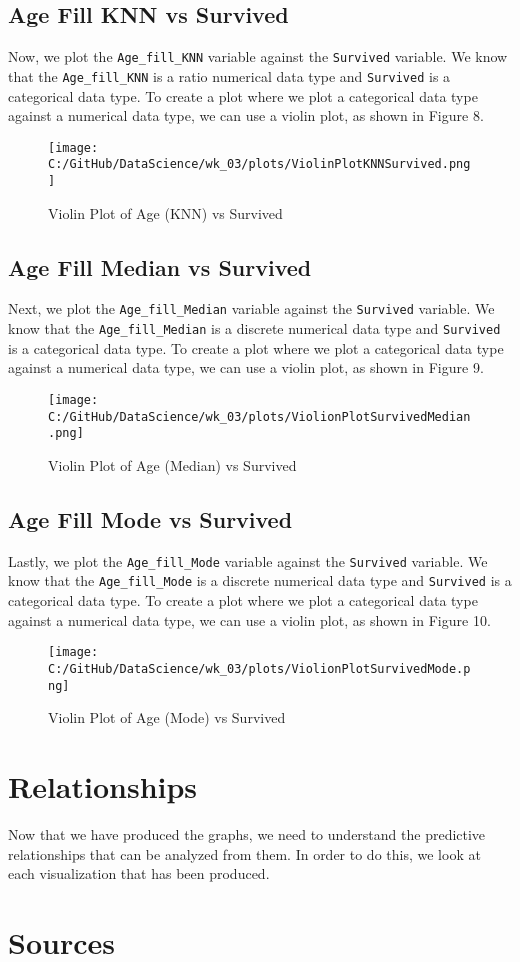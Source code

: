 \documentclass[a4paper, twocolumn]{article}
\begin{document}
\subsection{Age Fill KNN vs Survived}
Now, we plot the \texttt{Age\_fill\_KNN} variable against the \texttt{Survived} variable. We know that the 
\texttt{Age\_fill\_KNN} is a ratio numerical data type and \texttt{Survived} is a categorical data type.
To create a plot where we plot a categorical data type against a numerical data type, we can use a violin plot, as
shown in Figure 8.
\begin{figure}[h!] 
    \centering
    \noindent
    \texttt{[image: C:/GitHub/DataScience/wk\_03/plots/ViolinPlotKNNSurvived.png]}  
    \caption{Violin Plot of Age (KNN) vs Survived} 
\end{figure}

\subsection{Age Fill Median vs Survived}
Next, we plot the \texttt{Age\_fill\_Median} variable against the \texttt{Survived} variable. We know that the 
\texttt{Age\_fill\_Median} is a discrete numerical data type and \texttt{Survived} is a categorical data type.
To create a plot where we plot a categorical data type against a numerical data type, we can use a violin plot, as
shown in Figure 9.
\begin{figure}[h!] 
    \centering
    \noindent
    \texttt{[image: C:/GitHub/DataScience/wk\_03/plots/ViolionPlotSurvivedMedian.png]}  
    \caption{Violin Plot of Age (Median) vs Survived} 
\end{figure}

\subsection{Age Fill Mode vs Survived}
Lastly, we plot the \texttt{Age\_fill\_Mode} variable against the \texttt{Survived} variable. We know that the 
\texttt{Age\_fill\_Mode} is a discrete numerical data type and \texttt{Survived} is a categorical data type.
To create a plot where we plot a categorical data type against a numerical data type, we can use a violin plot, as
shown in Figure 10.
\begin{figure}[h!] 
    \centering
    \noindent
    \texttt{[image: C:/GitHub/DataScience/wk\_03/plots/ViolionPlotSurvivedMode.png]}  
    \caption{Violin Plot of Age (Mode) vs Survived} 
\end{figure}


\section{Relationships}
Now that we have produced the graphs, we need to understand the predictive relationships that can be analyzed 
from them. In order to do this, we look at each visualization that has been produced.

\subsection{}

\section{Sources}
\end{document}
